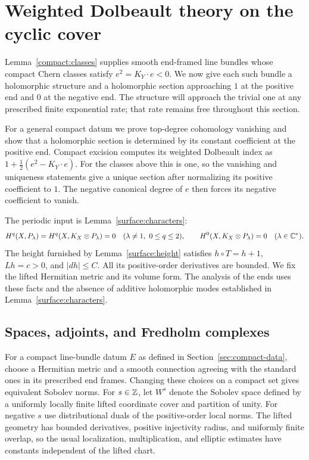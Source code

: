 \section{Weighted Dolbeault theory on the cyclic cover}\label{sec:weighted}

Lemma~\ref{compact:classes} supplies smooth end-framed line bundles
whose compact Chern classes satisfy $e^2=K_Y\cdot e<0$. We now give
each such bundle a holomorphic structure and a holomorphic section
approaching $1$ at the positive end and $0$ at the negative end.
The structure will approach the trivial one at any prescribed finite
exponential rate; that rate remains free throughout this section.

For a general compact datum we prove top-degree cohomology vanishing
and show that a holomorphic section is determined by its constant
coefficient at the positive end. Compact excision computes its weighted
Dolbeault index as $1+\tfrac12(e^2-K_Y\cdot e)$. For the classes above
this is one, so the vanishing and uniqueness statements give a unique
section after normalizing its positive coefficient to $1$. The
negative canonical degree of $e$ then forces its negative coefficient
to vanish.

The periodic input is Lemma~\ref{surface:characters}:
\begin{equation}\label{weighted:compact-vanishing}
 H^q(X,P_\lambda)=H^q(X,K_X\otimes P_\lambda)=0
 \quad(\lambda\ne1,\ 0\le q\le2),
 \qquad H^0(X,K_X\otimes P_\lambda)=0\quad(\lambda\in\mathbb C^*).
\end{equation}
The height furnished by Lemma~\ref{surface:height} satisfies
$h\circ T=h+1$, $Lh=c>0$, and $|dh|\le C$. All its positive-order
derivatives are bounded. We fix the lifted Hermitian metric and its volume
form. The analysis of the ends uses these facts and the absence of
additive holomorphic modes established in
Lemma~\ref{surface:characters}.

\subsection{Spaces, adjoints, and Fredholm complexes}

For a compact line-bundle datum $E$ as defined in
Section~\ref{sec:compact-data}, choose a Hermitian metric and a smooth
connection agreeing with the standard ones in its prescribed end frames.
Changing these choices on a compact set gives equivalent Sobolev norms.
For $s\in\mathbb Z$, let $W^s$ denote the Sobolev space defined by a uniformly
locally finite lifted coordinate cover and partition of unity. For
negative $s$ use distributional duals of the positive-order local norms.
The lifted geometry has bounded derivatives, positive injectivity radius,
and uniformly finite overlap, so the usual localization, multiplication,
and elliptic estimates have constants independent of the lifted chart.

